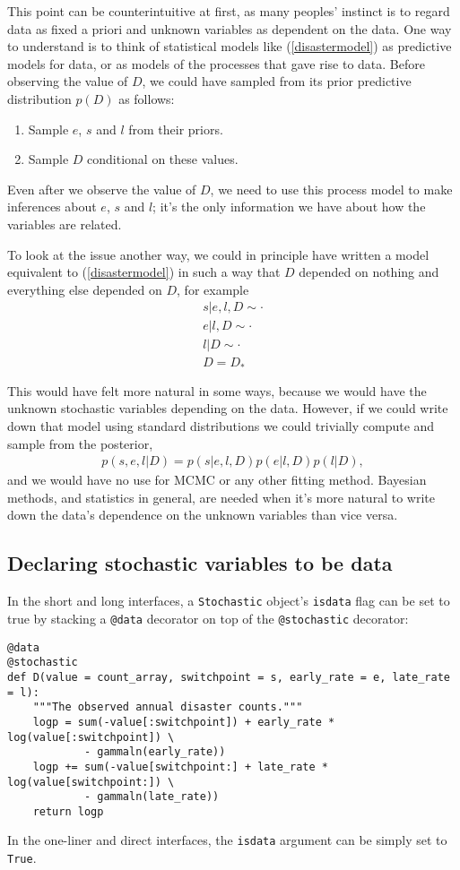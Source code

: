 This point can be counterintuitive at first, as many peoples' instinct is to regard data as fixed a priori and unknown variables as dependent on the data. One way to understand is to think of statistical models like (\ref{disastermodel}) as predictive models for data, or as models of the processes that gave rise to data. Before observing the value of $D$, we could have sampled from its prior predictive distribution $p(D)$ as follows:
\begin{enumerate}
    \item Sample $e$, $s$ and $l$ from their priors.
    \item Sample $D$ conditional on these values.
\end{enumerate}
Even after we observe the value of $D$, we need to use this process model to make inferences about $e$, $s$ and $l$; it's the only information we have about how the variables are related.

\medskip
To look at the issue another way, we could in principle have written a model equivalent to (\ref{disastermodel}) in such a way that $D$ depended on nothing and everything else depended on $D$, for example
\begin{eqnarray*}
    s|e,l,D\sim\cdot\\
    e|l,D\sim\cdot\\
    l|D\sim\cdot\\
    D=D_*
\end{eqnarray*}

This would have felt more natural in some ways, because we would have the unknown stochastic variables depending on the data. However, if we could write down that model using standard distributions we could trivially compute and sample from the posterior,
\begin{eqnarray*}
    p(s,e,l|D) = p(s|e, l, D) p(e|l, D) p(l|D),
\end{eqnarray*}
and we would have no use for MCMC or any other fitting method. Bayesian methods, and statistics in general, are needed when it's more natural to write down the data's dependence on the unknown variables than vice versa.

\subsection{Declaring stochastic variables to be data}

In the short and long interfaces, a \texttt{Stochastic} object's \texttt{isdata} flag can be set to true by stacking a \texttt{@data} decorator on top of the \texttt{@stochastic} decorator:
\begin{verbatim}
@data
@stochastic
def D(value = count_array, switchpoint = s, early_rate = e, late_rate = l):
    """The observed annual disaster counts."""
    logp = sum(-value[:switchpoint]) + early_rate * log(value[:switchpoint]) \
            - gammaln(early_rate))
    logp += sum(-value[switchpoint:] + late_rate * log(value[switchpoint:]) \
            - gammaln(late_rate))
    return logp
\end{verbatim}
In the one-liner and direct interfaces, the \texttt{isdata} argument can be simply set to \texttt{True}.


